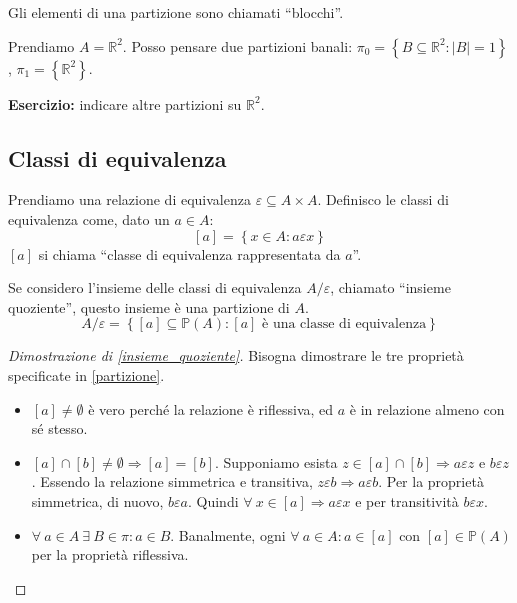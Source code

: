 Gli elementi di una partizione sono chiamati ``blocchi''.

Prendiamo $A = \mathbb{R}^2$. Posso pensare due partizioni banali: $\pi_0 = \left\{ B \subseteq \mathbb{R}^2 : |B| = 1 \right\}$, $\pi_1 = \left\{ \mathbb{R}^2 \right \}$.

\textbf{Esercizio:} indicare altre partizioni su $\mathbb{R}^2$.
\vspace{5cm}

\subsection{Classi di equivalenza}
\begin{defn}
Prendiamo una relazione di equivalenza $\varepsilon \subseteq A \times A$. Definisco le classi di equivalenza come, dato un $a \in A$:
\[
[a] = \left \{ x \in A : a \varepsilon x \right\}
\]
$[a]$ si chiama ``classe di equivalenza rappresentata da $a$''.
\end{defn}
\begin{prop}\label{insieme_quoziente}
Se considero l'insieme delle classi di equivalenza $A / \varepsilon$, chiamato ``insieme quoziente'', questo insieme \`e una partizione di $A$.
\[
A/\varepsilon = \left\{ [a] \subseteq \mathbb{P}(A) : [a] \text{ \`e una classe di equivalenza} \right\}
\]
\end{prop}
\begin{proof}[Dimostrazione di \ref{insieme_quoziente}]
Bisogna dimostrare le tre propriet\`a specificate in \ref{partizione}.
\begin{itemize}
  \item $[a] \neq \emptyset$ \`e vero perch\'e la relazione \`e riflessiva, ed $a$ \`e in relazione almeno con s\'e stesso.
  \item $[a] \cap [b] \neq \emptyset \Rightarrow [a] = [b]$. Supponiamo esista $z \in [a] \cap [b] \Rightarrow a \varepsilon z$ e $b \varepsilon z$. Essendo la relazione simmetrica e transitiva, $z \varepsilon b \Rightarrow a \varepsilon b$. Per la propriet\`a simmetrica, di nuovo, $b \varepsilon a$. Quindi $ \forall \ x \in [a] \Rightarrow a \varepsilon x $ e per transitivit\`a $ b \varepsilon x$.
  \item $\forall \ a \in A \ \exists \ B \in \pi : a \in B$. Banalmente, ogni $\forall \ a \in A : a \in [a]$ con $[a] \in \mathbb{P}(A)$ per la propriet\`a riflessiva.
\end{itemize}
\end{proof}

